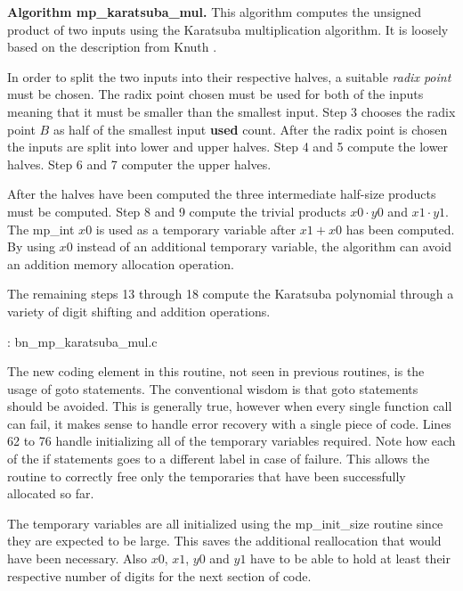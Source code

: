 \documentclass[b5paper]{book}
\begin{document}
\textbf{Algorithm mp\_karatsuba\_mul.}
This algorithm computes the unsigned product of two inputs using the Karatsuba multiplication algorithm.  It is loosely based on the description
from Knuth \cite[pp. 294-295]{TAOCPV2}.  

In order to split the two inputs into their respective halves, a suitable \textit{radix point} must be chosen.  The radix point chosen must
be used for both of the inputs meaning that it must be smaller than the smallest input.  Step 3 chooses the radix point $B$ as half of the 
smallest input \textbf{used} count.  After the radix point is chosen the inputs are split into lower and upper halves.  Step 4 and 5 
compute the lower halves.  Step 6 and 7 computer the upper halves.  

After the halves have been computed the three intermediate half-size products must be computed.  Step 8 and 9 compute the trivial products
$x0 \cdot y0$ and $x1 \cdot y1$.  The mp\_int $x0$ is used as a temporary variable after $x1 + x0$ has been computed.  By using $x0$ instead
of an additional temporary variable, the algorithm can avoid an addition memory allocation operation.

The remaining steps 13 through 18 compute the Karatsuba polynomial through a variety of digit shifting and addition operations.

\vspace{+3mm}\begin{small}
\hspace{-5.1mm}{\bf File}: bn\_mp\_karatsuba\_mul.c
\vspace{-3mm}
\begin{alltt}
\end{alltt}
\end{small}

The new coding element in this routine, not  seen in previous routines, is the usage of goto statements.  The conventional
wisdom is that goto statements should be avoided.  This is generally true, however when every single function call can fail, it makes sense
to handle error recovery with a single piece of code.  Lines 62 to 76 handle initializing all of the temporary variables 
required.  Note how each of the if statements goes to a different label in case of failure.  This allows the routine to correctly free only
the temporaries that have been successfully allocated so far.

The temporary variables are all initialized using the mp\_init\_size routine since they are expected to be large.  This saves the 
additional reallocation that would have been necessary.  Also $x0$, $x1$, $y0$ and $y1$ have to be able to hold at least their respective
number of digits for the next section of code.
\end{document}
